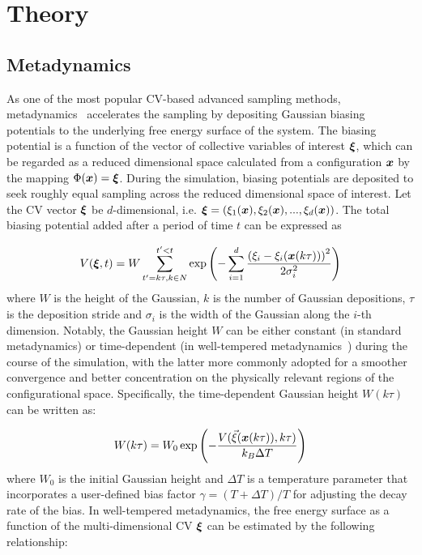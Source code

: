 \documentclass[journal=jacsat,manuscript=article]{achemso}
\newcommand{\bfv}[1]{{\mbox{\boldmath{$#1$}}}}
\newcommand{\x}{\bfv{x}}
\begin{document}
\section{Theory}
\subsection{Metadynamics}
As one of the most popular CV-based advanced sampling methods, metadynamics~\cite{metad} accelerates the sampling by depositing Gaussian biasing potentials to the underlying free energy surface of the system. The biasing potential is a function of the vector of collective variables of interest $\bfv{\xi}$, which can be regarded as a reduced dimensional space calculated from a configuration $\x$ by the mapping $\Phi(\x)=\bfv{\xi}$. During the simulation, biasing potentials are deposited to seek roughly equal sampling across the reduced dimensional space of interest. Let the CV vector $\bfv{\xi}$ be $d$-dimensional, i.e. $\bfv{\xi}=(\xi_{1}(\x), \xi_{2}(\x), ..., \xi_{d}(\x))$. The total biasing potential added after a period of time $t$ can be expressed as 

\begin{equation}
    V(\bfv{\xi}, t) = W \sum_{t'=k\tau, k \in N}^{t'<t}\exp \left( -\sum_{i=1}^{d}\frac{\left(\xi_{i}-\xi_{i}(\x (k\tau))\right)^{2}}{2\sigma_{i}^{2}}\right)
\end{equation}
where $W$ is the height of the Gaussian, $k$ is the number of Gaussian depositions, $\tau$ is the deposition stride and $\sigma_{i}$ is the width of the Gaussian along the $i$-th dimension. Notably, the Gaussian height $W$ can be either constant (in standard metadynamics) or time-dependent (in well-tempered metadynamics~\cite{WTMetaD}) during the course of the simulation, with the latter more commonly adopted for a smoother convergence and better concentration on the physically relevant regions of the configurational space. Specifically, the time-dependent Gaussian height $W(k\tau)$ can be written as:

\begin{equation}
    W(k\tau)=W_{0}\exp \left(-\frac{V(\vec{\xi}(\x(k\tau)), k\tau)}{k_{B}\Delta T} \right)
\end{equation}
where $W_0$ is the initial Gaussian height and $\Delta T$ is a temperature parameter that incorporates a user-defined bias factor $\gamma=(T + \Delta T)/T$ for adjusting the decay rate of the bias. In well-tempered metadynamics, the free energy surface as a function of the multi-dimensional CV $\bfv{\xi}$ can be estimated by the following relationship:
\end{document}
